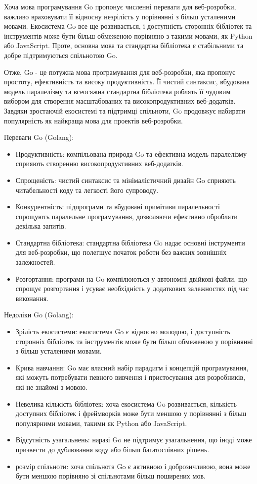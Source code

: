 Хоча мова програмування Go пропонує численні переваги для веб-розробки, важливо враховувати її відносну незрілість у порівнянні з більш усталеними мовами. Екосистема Go все ще розвивається, і доступність сторонніх бібліотек та інструментів може бути більш обмеженою порівняно з такими мовами, як Python або JavaScript. Проте, основна мова та стандартна бібліотека є стабільними та добре підтримуються спільнотою Go.

Отже, Go - це потужна мова програмування для веб-розробки, яка пропонує простоту, ефективність та високу продуктивність. Її чистий синтаксис, вбудована модель паралелізму та всеосяжна стандартна бібліотека роблять її чудовим вибором для створення масштабованих та високопродуктивних веб-додатків. Завдяки зростаючій екосистемі та підтримці спільноти, Go продовжує набирати популярність як найкраща мова для проектів веб-розробки.

Переваги Go (Golang):
\begin{itemize}
    \item Продуктивність: компільована природа Go та ефективна модель паралелізму сприяють створенню високопродуктивних веб-додатків.
    \item Спрощеність: чистий синтаксис та мінімалістичний дизайн Go сприяють читабельності коду та легкості його супроводу.
    \item Конкурентність: підпрограми та вбудовані примітиви паралельності спрощують паралельне програмування, дозволяючи ефективно обробляти декілька запитів.
    \item Стандартна бібліотека: стандартна бібліотека Go надає основні інструменти для веб-розробки, що полегшує початок роботи без важких зовнішніх залежностей.
    \item Розгортання: програми на Go компілюються у автономні двійкові файли, що спрощує розгортання і усуває необхідність у додаткових залежностях під час виконання.
\end{itemize}

Недоліки Go (Golang):
\begin{itemize}
    \item Зрілість екосистеми: екосистема Go є відносно молодою, і доступність сторонніх бібліотек та інструментів може бути більш обмеженою у порівнянні з більш усталеними мовами.
    \item Крива навчання: Go має власний набір парадигм і концепцій програмування, які можуть потребувати певного вивчення і пристосування для розробників, які не знайомі з мовою.
    \item Невелика кількість бібліотек: хоча екосистема Go розвивається, кількість доступних бібліотек і фреймворків може бути меншою у порівнянні з більш популярними мовами, такими як Python або JavaScript.
    \item Відсутність узагальнень: наразі Go не підтримує узагальнення, що іноді може призвести до дублювання коду або більш багатослівних рішень.
    \item розмір спільноти: хоча спільнота Go є активною і доброзичливою, вона може бути меншою порівняно зі спільнотами більш поширених мов.
\end{itemize}